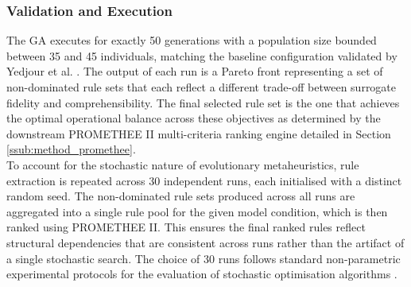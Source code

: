 \subsubsection{Validation and Execution}
\label{ssub:method_ga_validation}
The GA executes for exactly 50 generations with a population size bounded between 
35 and 45 individuals, matching the baseline configuration validated by Yedjour 
et al. \cite{Yedjour2024}. The output of each run is a Pareto front representing 
a set of non-dominated rule sets that each reflect a different trade-off between 
surrogate fidelity and comprehensibility. The final selected rule set is the one 
that achieves the optimal operational balance across these objectives as 
determined by the downstream PROMETHEE II multi-criteria ranking engine detailed 
in Section \ref{ssub:method_promethee}. 
\\
To account for the stochastic nature of evolutionary metaheuristics, rule 
extraction is repeated across 30 independent runs, each initialised with a 
distinct random seed. The non-dominated rule sets produced across all runs are 
aggregated into a single rule pool for the given model condition, which is then 
ranked using PROMETHEE II. This ensures the final ranked rules reflect structural 
dependencies that are consistent across runs rather than the artifact of a 
single stochastic search. The choice of 30 runs follows standard non-parametric 
experimental protocols for the evaluation of stochastic optimisation algorithms 
\cite{Derrac2011}.